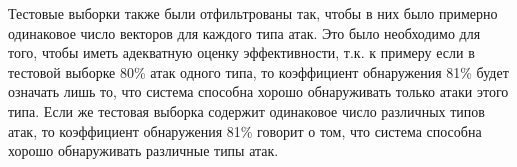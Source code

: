 \documentclass[12pt,a4paper]{article}
\begin{document}
Тестовые выборки также были отфильтрованы так, чтобы в них было примерно одинаковое число векторов для каждого типа атак. Это было
необходимо для того, чтобы иметь адекватную оценку эффективности, т.к. к примеру если в тестовой выборке 80\% атак одного типа, то
коэффициент обнаружения 81\% будет означать лишь то, что система способна хорошо обнаруживать только атаки этого типа. Если же
тестовая выборка содержит одинаковое число различных типов атак, то коэффициент обнаружения 81\% говорит о том, что система
способна хорошо обнаруживать различные типы атак.
\end{document}
